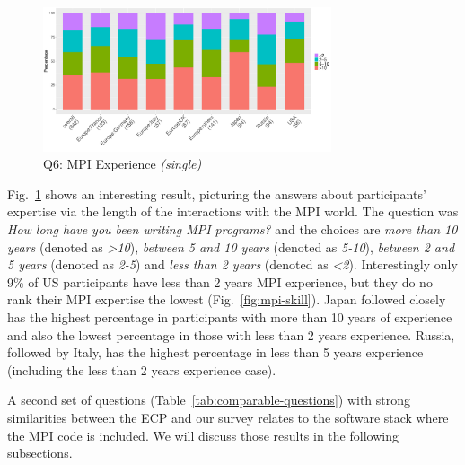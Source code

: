 \documentclass[preprint,5p,times]{elsarticle}
\def\myquote#1{{\it #1}}
\begin{document}
\begin{figure}[htb]
  \begin{center}
    \includegraphics[width=8.5cm]{R-scripts/Q6.pdf}
    \caption{Q6: MPI Experience {\it(single)}}
    \label{fig:mpi-experience}
  \end{center}
\end{figure}

Fig.~\ref{fig:mpi-experience} shows an interesting result, picturing the answers
about participants' expertise via the length of the interactions with the MPI
world. The question was {\it How long have you been writing MPI programs?} and
the choices are {\it more than 10 years} (denoted as \myquote{\textgreater 10}),
\myquote{between 5 and 10 years} (denoted as \myquote{5-10}), \myquote{between 2
and 5 years} (denoted as \myquote{2-5}) and \myquote{less than 2 years} (denoted
as \myquote{\textless 2}). Interestingly only 9\% of US participants have less
than 2 years MPI experience, but they do no rank their MPI expertise the lowest
(Fig.~\ref {fig:mpi-skill}). Japan followed closely has the highest percentage
in participants with more than 10 years of experience and also the lowest
percentage in those with less than 2 years experience. Russia, followed by
Italy, has the highest percentage in less than 5 years experience (including the
less than 2 years experience case).

A second set of questions (Table~\ref{tab:comparable-questions}) with strong
similarities between the ECP and our survey relates to the software stack where
the MPI code is included. We will discuss those results in the following
subsections.
\end{document}
